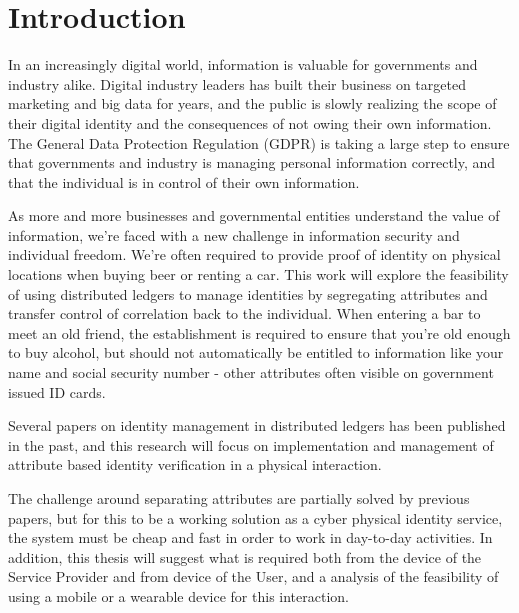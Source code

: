 \chapter{Introduction}
\label{chap:introduction}
In an increasingly digital world, information is valuable for governments and industry alike. Digital industry leaders has built their business on targeted marketing and big data for years, and the public is slowly realizing the scope of their digital identity and the consequences of not owing their own information. The General Data Protection Regulation (GDPR) is taking a large step to ensure that governments and industry is managing personal information correctly, and that the individual is in control of their own information. 

As more and more businesses and governmental entities understand the value of information, we're faced with a new challenge in information security and individual freedom. We're often required to provide proof of identity on physical locations when buying beer or renting a car. This work will explore the feasibility of using distributed ledgers to manage identities by segregating attributes and transfer control of correlation back to the individual. When entering a bar to meet an old friend, the establishment is required to ensure that you're old enough to buy alcohol, but should not automatically be entitled to information like your name and social security number - other attributes often visible on government issued ID cards. 

Several papers on identity management in distributed ledgers has been published in the past, and this research will focus on implementation and management of attribute based identity verification in a physical interaction. 

The challenge around separating attributes are partially solved by previous papers, but for this to be a working solution as a cyber physical identity service, the system must be cheap and fast in order to work in day-to-day activities. In addition, this thesis will suggest what is required both from the device of the Service Provider and from device of the User, and a analysis of the feasibility of using a mobile or a wearable device for this interaction.


